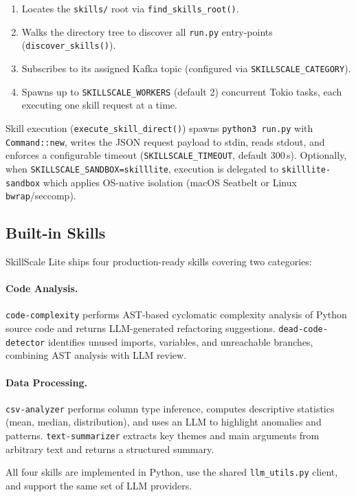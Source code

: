 \documentclass[sigconf,nonacm]{acmart}
\begin{document}
\begin{enumerate}
  \item Locates the \texttt{skills/} root via \texttt{find\_skills\_root()}.
  \item Walks the directory tree to discover all \texttt{run.py} entry-points (\texttt{discover\_skills()}).
  \item Subscribes to its assigned Kafka topic (configured via \texttt{SKILLSCALE\_CATEGORY}).
  \item Spawns up to \texttt{SKILLSCALE\_WORKERS} (default 2) concurrent Tokio tasks, each executing one skill request at a time.
\end{enumerate}

Skill execution (\texttt{execute\_skill\_direct()}) spawns \texttt{python3 run.py} with \texttt{Command::new}, writes the JSON request payload to stdin, reads stdout, and enforces a configurable timeout (\texttt{SKILLSCALE\_TIMEOUT}, default 300\,s). Optionally, when \texttt{SKILLSCALE\_SANDBOX=skilllite}, execution is delegated to \texttt{skilllite-sandbox} which applies OS-native isolation (macOS Seatbelt or Linux \texttt{bwrap}/seccomp).

\subsection{Built-in Skills}

SkillScale Lite ships four production-ready skills covering two categories:

\paragraph{Code Analysis.} \texttt{code-complexity} performs AST-based cyclomatic complexity analysis of Python source code and returns LLM-generated refactoring suggestions. \texttt{dead-code-detector} identifies unused imports, variables, and unreachable branches, combining AST analysis with LLM review.

\paragraph{Data Processing.} \texttt{csv-analyzer} performs column type inference, computes descriptive statistics (mean, median, distribution), and uses an LLM to highlight anomalies and patterns. \texttt{text-summarizer} extracts key themes and main arguments from arbitrary text and returns a structured summary.

All four skills are implemented in Python, use the shared \texttt{llm\_utils.py} client, and support the same set of LLM providers.
\end{document}
